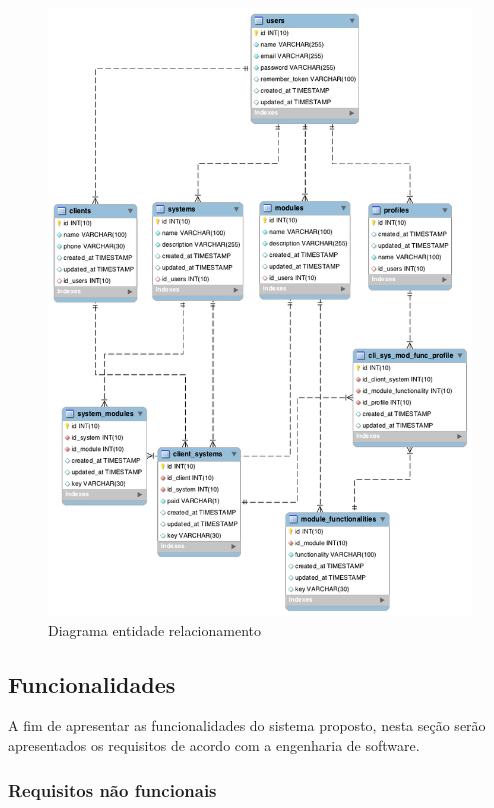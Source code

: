 \begin{figure}
	\label{fig:DER}
	\includegraphics[width=1\textwidth]{img/DER}
	\caption{Diagrama entidade relacionamento}
\end{figure}




\subsection{Funcionalidades}


A fim de apresentar as funcionalidades do sistema proposto, nesta seção serão apresentados os requisitos de acordo com a engenharia de software.


\subsubsection{Requisitos não funcionais}



